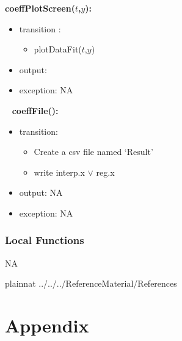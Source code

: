 \documentclass[12pt, titlepage]{article}
\begin{document}
\noindent \textbf{coeffPlotScreen($t$,$y$):}
\begin{itemize}
	\item transition :
	\begin{itemize}
		\item plotDataFit($t$,$y$)
	\end{itemize}
	\item output:  
	\item exception: NA
\end{itemize}


~\newline
\noindent \textbf{coeffFile():}
\begin{itemize}
	\item transition: 
	\begin{itemize}
		
		\item Create a csv file named `Result'
		\item write interp.x $\lor$ reg.x
	\end{itemize}
	\item output: NA
	\item exception: NA 
\end{itemize}




\subsubsection{Local Functions}

NA






\newpage




 {plainnat}
 {../../../ReferenceMaterial/References}

\newpage



\section{Appendix} \label{Appendix}

\end{document}
